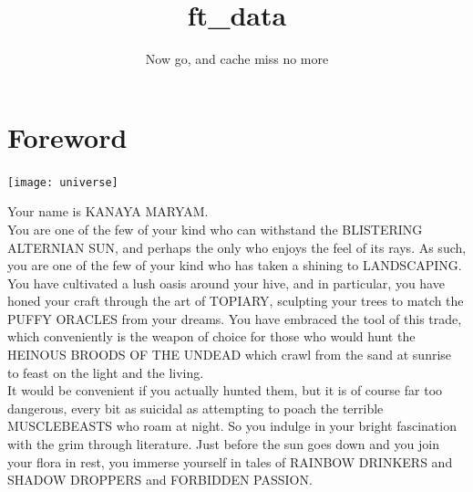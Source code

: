 \documentclass{42-en}
\begin{document}
                           \title{ft_data}
                          \subtitle{Now go, and cache miss no more}


\maketitle

\tableofcontents


\chapter{Foreword}

    \texttt{[image: universe]}

    Your name is KANAYA MARYAM.\\

    You are one of the few of your kind who can withstand the BLISTERING ALTERNIAN SUN,
    and perhaps the only who enjoys the feel of its rays.
    As such, you are one of the few of your kind who has taken a shining to LANDSCAPING.
    You have cultivated a lush oasis around your hive, and in particular,
    you have honed your craft through the art of TOPIARY,
    sculpting your trees to match the PUFFY ORACLES from your dreams.
    You have embraced the tool of this trade,
    which conveniently is the weapon of choice for those who would hunt the
    HEINOUS BROODS OF THE UNDEAD which crawl from the sand at sunrise to feast on the light and the living.\\

    It would be convenient if you actually hunted them,
    but it is of course far too dangerous,
    every bit as suicidal as attempting to poach the terrible MUSCLEBEASTS who roam at night.
    So you indulge in your bright fascination with the grim through literature.
    Just before the sun goes down and you join your flora in rest,
    you immerse yourself in tales of RAINBOW DRINKERS and SHADOW DROPPERS and FORBIDDEN PASSION.\\
\end{document}
